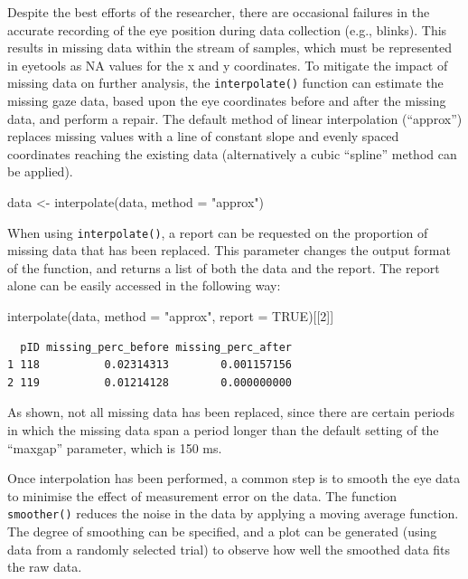 \documentclass[
  man,
  floatsintext,
  longtable,
  nolmodern,
  notxfonts,
  notimes,
  colorlinks=true,linkcolor=blue,citecolor=blue,urlcolor=blue]{apa7}
\newenvironment{Shaded}{\begin{snugshade}}{\end{snugshade}}
\newcommand{\AttributeTok}[1]{\textcolor[rgb]{0.40,0.45,0.13}{#1}}
\newcommand{\ConstantTok}[1]{\textcolor[rgb]{0.56,0.35,0.01}{#1}}
\newcommand{\DecValTok}[1]{\textcolor[rgb]{0.68,0.00,0.00}{#1}}
\newcommand{\FunctionTok}[1]{\textcolor[rgb]{0.28,0.35,0.67}{#1}}
\newcommand{\NormalTok}[1]{\textcolor[rgb]{0.00,0.23,0.31}{#1}}
\newcommand{\OtherTok}[1]{\textcolor[rgb]{0.00,0.23,0.31}{#1}}
\newcommand{\StringTok}[1]{\textcolor[rgb]{0.13,0.47,0.30}{#1}}
\begin{document}
Despite the best efforts of the researcher, there are occasional
failures in the accurate recording of the eye position during data
collection (e.g., blinks). This results in missing data within the
stream of samples, which must be represented in eyetools as NA values
for the x and y coordinates. To mitigate the impact of missing data on
further analysis, the \texttt{interpolate()} function can estimate the
missing gaze data, based upon the eye coordinates before and after the
missing data, and perform a repair. The default method of linear
interpolation (``approx'') replaces missing values with a line of
constant slope and evenly spaced coordinates reaching the existing data
(alternatively a cubic ``spline'' method can be applied).

\begin{Shaded}
\begin{Highlighting}[]
\NormalTok{data }\OtherTok{\textless{}{-}} \FunctionTok{interpolate}\NormalTok{(data, }
                    \AttributeTok{method =} \StringTok{"approx"}\NormalTok{)}
\end{Highlighting}
\end{Shaded}

When using \texttt{interpolate()}, a report can be requested on the
proportion of missing data that has been replaced. This parameter
changes the output format of the function, and returns a list of both
the data and the report. The report alone can be easily accessed in the
following way:

\begin{Shaded}
\begin{Highlighting}[]
\FunctionTok{interpolate}\NormalTok{(data, }
            \AttributeTok{method =} \StringTok{"approx"}\NormalTok{, }
            \AttributeTok{report =} \ConstantTok{TRUE}\NormalTok{)[[}\DecValTok{2}\NormalTok{]]}
\end{Highlighting}
\end{Shaded}

\begin{verbatim}
  pID missing_perc_before missing_perc_after
1 118          0.02314313        0.001157156
2 119          0.01214128        0.000000000
\end{verbatim}

As shown, not all missing data has been replaced, since there are
certain periods in which the missing data span a period longer than the
default setting of the ``maxgap'' parameter, which is 150 ms.

Once interpolation has been performed, a common step is to smooth the
eye data to minimise the effect of measurement error on the data. The
function \texttt{smoother()} reduces the noise in the data by applying a
moving average function. The degree of smoothing can be specified, and a
plot can be generated (using data from a randomly selected trial) to
observe how well the smoothed data fits the raw data.
\end{document}
